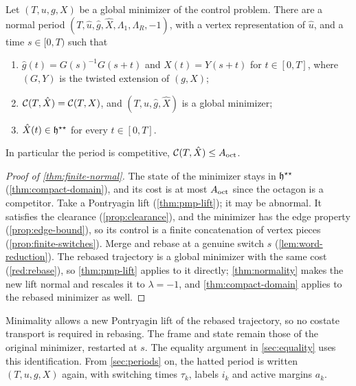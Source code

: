 \begin{theorem}\label{thm:finite-normal}
Let $(T,u,g,X)$ be a global minimizer of the control problem. There are a normal period
$(T,\hat u,\hat g,\hat X,\Lambda_1,\Lambda_R,-1)$, with a vertex representation of $\hat u$, and a
time $s\in[0,T)$ such that
\begin{enumerate}
\item $\hat g(t)=G(s)^{-1}G(s+t)$ and $\hat X(t)=Y(s+t)$ for $t\in[0,T]$, where $(G,Y)$ is the
  twisted extension of $(g,X)$;
\item $\mathcal{C}(T,\hat X)=\mathcal{C}(T,X)$, and $(T,\hat u,\hat g,\hat X)$ is a global minimizer;
\item $\hat X(t)\in\mathfrak{h}^{\star\star}$ for every $t\in[0,T]$.
\end{enumerate}
In particular the period is competitive,
$\mathcal{C}(T,\hat X)\le A_{\mathrm{oct}}$.
\end{theorem}

\begin{proof}[Proof of \cref{thm:finite-normal}]
The state of the minimizer stays in $\mathfrak{h}^{\star\star}$ (\cref{thm:compact-domain}), and its cost is at
most $A_{\mathrm{oct}}$ since the octagon is a competitor. Take a Pontryagin lift (\cref{thm:pmp-lift}); it may
be abnormal. It satisfies the clearance (\cref{prop:clearance}), and the minimizer has the edge
property (\cref{prop:edge-bound}), so its control is a finite concatenation of vertex pieces
(\cref{prop:finite-switches}). Merge and rebase at a genuine switch $s$ (\cref{lem:word-reduction}).
The rebased trajectory is a global minimizer with the same cost (\cref{red:rebase}), so
\cref{thm:pmp-lift} applies to it directly; \cref{thm:normality} makes the new lift normal and
rescales it to $\lambda=-1$, and \cref{thm:compact-domain} applies to the rebased minimizer as
well.
\end{proof}

Minimality allows a new Pontryagin lift of the rebased trajectory, so no costate transport is
required in rebasing. The frame and state remain those of the original minimizer, restarted at
$s$. The equality argument in \cref{sec:equality} uses this identification. From
\cref{sec:periods} on, the hatted period is written $(T,u,g,X)$ again, with switching times
$\tau_k$, labels $i_k$ and active margins $a_k$.